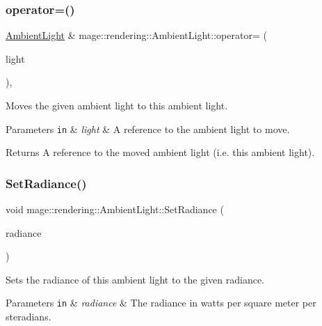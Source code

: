 \subsubsection{\texorpdfstring{operator=()}{operator=()}\hspace{0.1cm}{\footnotesize\ttfamily [2/2]}}
{\footnotesize\ttfamily \hyperlink{classmage_1_1rendering_1_1_ambient_light}{Ambient\+Light} \& mage\+::rendering\+::\+Ambient\+Light\+::operator= (\begin{DoxyParamCaption}\item[{\hyperlink{classmage_1_1rendering_1_1_ambient_light}{Ambient\+Light} \&\&}]{light }\end{DoxyParamCaption})\hspace{0.3cm}{\ttfamily [default]}, {\ttfamily [noexcept]}}

Moves the given ambient light to this ambient light.


\begin{DoxyParams}[1]{Parameters}
\mbox{\tt in}  & {\em light} & A reference to the ambient light to move. \\
\hline
\end{DoxyParams}
\begin{DoxyReturn}{Returns}
A reference to the moved ambient light (i.\+e. this ambient light). 
\end{DoxyReturn}
\hypertarget{classmage_1_1rendering_1_1_ambient_light_a2da2e614906dc166121a0d0d391b9fc2}{}\label{classmage_1_1rendering_1_1_ambient_light_a2da2e614906dc166121a0d0d391b9fc2} 
\subsubsection{\texorpdfstring{Set\+Radiance()}{SetRadiance()}}
{\footnotesize\ttfamily void mage\+::rendering\+::\+Ambient\+Light\+::\+Set\+Radiance (\begin{DoxyParamCaption}\item[{\hyperlink{namespacemage_aa97e833b45f06d60a0a9c4fc22ae02c0}{F32}}]{radiance }\end{DoxyParamCaption})\hspace{0.3cm}{\ttfamily [noexcept]}}

Sets the radiance of this ambient light to the given radiance.


\begin{DoxyParams}[1]{Parameters}
\mbox{\tt in}  & {\em radiance} & The radiance in watts per square meter per steradians. \\
\hline
\end{DoxyParams}


